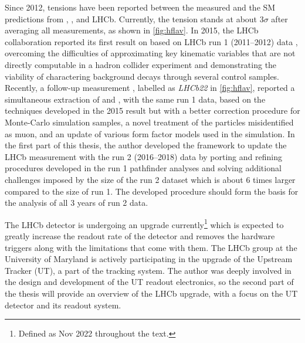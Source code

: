 Since 2012, tensions have been reported between the measured \RDX and the SM
predictions from \babar, \belle, and LHCb.
Currently, the tension stands at about $3 \sigma$ after averaging all
measurements,
as shown in \cref{fig:hflav}.
In 2015, the LHCb collaboration reported its first result on \RDst
based on LHCb run 1 (2011--2012) data
\cite{PhysRevLett.115.111803},
overcoming the difficulties of approximating key kinematic variables
that are not directly computable in a hadron collider experiment
and demonstrating the viability of charactering background decays through
several control samples.
Recently, a follow-up measurement
\cite{RD_RDst_run1_2023},
labelled as \emph{LHCb22} in \cref{fig:hflav},
reported a simultaneous extraction of \RD and \RDst,
with the same run 1 data,
based on the techniques developed in the 2015 result but with
a better correction procedure for Monte-Carlo simulation samples,
a novel treatment of the particles misidentified as muon,
and an update of various form factor models used in the simulation.
In the first part of this thesis,
the author developed the framework to update the LHCb \RDX measurement with the
run 2 (2016--2018) data by porting and refining procedures developed in the run
1 pathfinder analyses and solving additional challenges imposed by the size of
the run 2 dataset which is about 6 times larger compared to the size of run 1.
The developed procedure should form the basis for the analysis of all 3 years
of run 2 data.

The LHCb detector is undergoing an upgrade currently\footnote{
    Defined as Nov 2022 throughout the text.
} which is expected to greatly increase
the readout rate of the detector and removes the hardware triggers along
with the limitations that come with them.
The LHCb group at the University of Maryland is actively participating in the
upgrade of the Upstream Tracker (UT), a part of the tracking system.
The author was deeply involved in the design and development of the UT readout
electronics,
so the second part of the thesis will provide an overview of the LHCb upgrade,
with a focus on the UT detector and its readout system.

